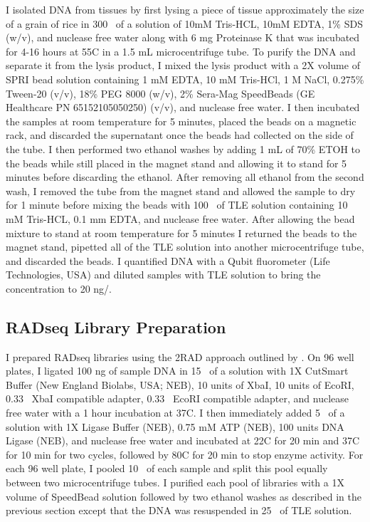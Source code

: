 I isolated DNA from tissues by first lysing a piece of tissue approximately 
the size of a grain of rice in 300 \uL\ of a solution of 10mM Tris-HCL, 10mM EDTA, 
1\% SDS (w/v), and nuclease free water along with 6 mg Proteinase K that was 
incubated for 4-16 hours at 55\degree C in a 1.5 mL microcentrifuge tube.  
To purify the DNA and separate it from the lysis product, I mixed the lysis 
product with a 2X volume of SPRI bead solution containing 1 mM EDTA,  
10 mM Tris-HCl, 1 M NaCl, 0.275\% Tween-20 (v/v), 18\% PEG 8000 (w/v), 
2\% Sera-Mag SpeedBeads (GE Healthcare PN 65152105050250) (v/v), and nuclease free water.
I then incubated the samples at room temperature for 5 minutes, placed the 
beads on a magnetic rack, and discarded the supernatant once the beads had collected
on the side of the tube.  
I then performed two ethanol washes by adding 1 mL of 70\% ETOH to the beads
while still placed in the magnet stand and allowing it to stand for 5 minutes
before discarding the ethanol. 
After removing all ethanol from the second wash, I removed the tube from the magnet 
stand and allowed the sample to dry for 1 minute before mixing the beads with 100 \uL\ of 
TLE solution containing 10 mM Tris-HCL, 0.1 mm EDTA, and nuclease free water.
After allowing the bead mixture to stand at room temperature for 5 minutes I returned
the beads to the magnet stand, pipetted all of the TLE solution into another 
microcentrifuge tube, and discarded the beads. I quantified DNA with a Qubit
fluorometer (Life Technologies, USA) and diluted samples with TLE solution to 
bring the concentration to 20 ng/\uL.

\subsection{RADseq Library Preparation}
I prepared RADseq libraries using the 2RAD approach outlined by \cite{bayona-vasquez2019}. 
On 96 well plates, I ligated 100 ng of sample DNA in 15 \uL\ of a solution with 
1X CutSmart Buffer (New England Biolabs, USA; NEB), 10 units of XbaI,
10 units of EcoRI, 0.33 \uM\ XbaI compatible adapter, 0.33 \uM\ EcoRI compatible adapter,
and nuclease free water with a 1 hour incubation at 37\degree C. 
I then immediately added 5 \uL\ of a solution with 1X Ligase Buffer (NEB),
0.75 mM ATP (NEB), 100 units DNA Ligase (NEB), and nuclease free water 
and incubated at 22\degree C for 20 min and 37\degree C for 10 min for two cycles, 
followed by 80\degree C for 20 min to stop enzyme activity.
For each 96 well plate, I pooled 10 \uL\ of each sample and split this pool 
equally between two microcentrifuge tubes.
I purified each pool of libraries with a 1X volume of SpeedBead solution followed 
by two ethanol washes as described in the previous section except that the DNA 
was resuspended in 25 \uL\ of TLE solution. 

